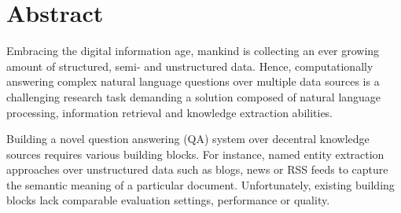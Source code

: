 \chapter*{Abstract}
Embracing the digital information age, mankind is collecting an ever growing amount of structured, semi- and unstructured data. 
Hence, computationally answering complex natural language questions over multiple data sources is a challenging research task demanding a solution composed of natural language processing, information retrieval and knowledge extraction abilities. 

Building a novel question answering (QA) system over decentral knowledge sources requires various building blocks.
For instance, named entity extraction approaches over unstructured data such as blogs, news or RSS feeds to capture the semantic meaning of a particular document.
Unfortunately, existing building blocks lack comparable evaluation settings, performance or quality. 

